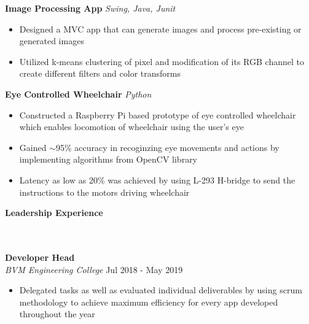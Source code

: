 \documentclass[]{article}
\newcommand{\lineunder} {
    \vspace*{-8pt} \\
    \hrulefill \\
}
\newcommand{\header} [1] {
    {\vspace*{6pt} \fontsize{12}{12}\selectfont \textbf{#1}}
     \lineunder
}
\begin{document}
\vspace{-2mm}
{\hspace{2mm}\textbf{Image Processing App}} {\sl Swing, Java, Junit} \\
\vspace{-3mm}
\begin{itemize}
        \setlength\itemsep{-1mm}
        \item Designed a MVC app that can generate images and process pre-existing or generated images  
        \item Utilized k-means clustering of pixel and modification of its RGB channel to create different filters and color transforms 
\end{itemize}

\vspace{-2mm}
{\hspace{2mm}\textbf{Eye Controlled Wheelchair}} {\sl Python} \\
\vspace{-3mm}
\begin{itemize}
        \setlength\itemsep{-1mm}
        \item Constructed a Raspberry Pi based prototype of eye controlled wheelchair which enables
        locomotion of wheelchair using the user's eye
        \item Gained $\sim$95\% accuracy in recoginzing eye movements and actions by implementing
        algorithms from OpenCV library
        \item Latency as low as 20\% was achieved by using L-293 H-bridge to send the instructions to
        the motors driving wheelchair
\end{itemize}

\vspace{-3mm}
\header{Leadership Experience}
\hspace{1mm}
\textbf{Developer Head}\\ 
\hspace{1mm}
\textit{BVM Engineering College} \hfill Jul 2018 - May 2019\\
\vspace{-3mm}
\begin{itemize}
	\setlength\itemsep{-1mm}
		\item Delegated tasks as well as evaluated individual deliverables by using scrum methodology to achieve maximum efficiency for every app developed throughout the year
\end{itemize}

\ 
\end{document}
